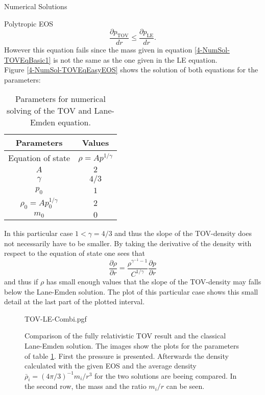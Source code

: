 \begin{section}{Numerical Solutions}
\begin{subsection}{Polytropic EOS}
\begin{equation}
	\frac{\partial p_{\text{TOV}}}{dr} \leq \frac{\partial p_{\text{LE}}}{dr}.
\end{equation}
However this equation fails since the mass given in equation \ref{4-NumSol-TOVEqBasic1} is not the same as the one given in the LE equation.\\
Figure \ref{4-NumSol-TOVEqEasyEOS} shows the solution of both equations for the parameters:
\begin{table}[h]
	\centering
	\begin{tabular}{|c|c|}
		\hline
		Parameters & Values \\
		\hline
		Equation of state & $\rho=Ap^{1/\gamma}$ \\
		$A$ & $2$\\
		$\gamma$ & $4/3$ \\
		$p_0$ & $1$ \\
		$\rho_0=Ap_0^{1/\gamma}$ & $2$\\ 
		$m_0$ & $0$\\
		\hline
	\end{tabular}
	\caption[Numerical Parameters for TOV and Lane-Emden equation]{Parameters for numerical solving of the TOV and Lane-Emden equation.}
	\label{4-NumSol-TOVParameters}
\end{table}
In this particular case $1<\gamma=4/3$ and thus the slope of the TOV-density does not necessarily have to be smaller. By taking the derivative of the density with respect to the equation of state one sees that
\begin{equation}
	\frac{\partial\rho}{\partial r} = \frac{\rho^{\gamma^{-1}-1}}{C^{1/\gamma}}\frac{\partial p}{\partial r}
\end{equation}
and thus if $\rho$ has small enough values that the slope of the TOV-density may falls below the Lane-Emden solution. The plot of this particular case shows this small detail at the last part of the plotted interval.
\begin{figure}[H]
	\centering
	{TOV-LE-Combi.pgf}
	\caption[Comparison TOV and LE equation]{Comparison of the fully relativistic TOV result and the classical Lane-Emden solution. The images show the plots for the parameters of table \ref{4-NumSol-TOVParameters}. First the pressure is presented. Afterwards the density calculated with the given EOS and the average density $\bar{\rho}_i=(4\pi/3)^{-1}m_i/r^3$ for the two solutions are beeing compared. In the second row, the mass and the ratio $m_i/r$ can be seen.}

\end{figure}
\end{subsection}
\end{section}
